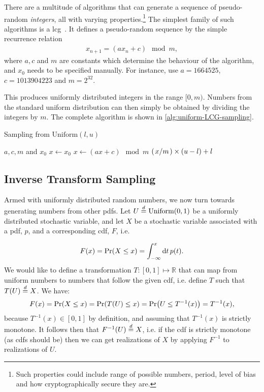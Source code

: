 \documentclass[Thesis.tex]{subfiles}
\begin{document}
There are a multitude of algorithms that can generate a sequence of
pseudo-random \emph{integers}, all with varying properties.\footnote{Such properties
could include range of possible numbers, period, level of bias and how
cryptographically secure they are.} The simplest family of
such algorithms is a \gls{lcg}~\cite{Knuth-1997-ACP-270146}. It defines a
pseudo-random sequence by the simple recurrence relation
\begin{align}
    \label{eq:linear-congruential-generator-relation}
    x_{n+1} = (ax_n + c)\mod m,
\end{align}
where $a, c$ and $m$ are constants which determine the behaviour of the
algorithm, and $x_0$ needs to be specified manually. For instance,
\textcite{Numerical-Recipes-Press-et-al} use $a = 1664525$, $c=1013904223$ and
$m=2^{32}$.

This produces uniformly distributed integers in the range $[0, m)$. Numbers
from the standard uniform distribution can then simply be obtained by dividing
the integers by $m$. The complete algorithm is shown in \cref{alg:uniform-LCG-sampling}.

\begin{algorithm}[h]
    \caption{Sampling from $\text{Uniform}(l, u)$}
    \label{alg:uniform-LCG-sampling}
    \begin{algorithmic}[1]
        \Require $a, c, m$ and $x_0$
            \State $x\gets x_0$
            \Repeat
                \State $x\gets (ax + c)\mod m$
                \State \Yield $(\flatfrac{x}{m}) \times (u - l) + l$
        \EndFunction
    \end{algorithmic}
\end{algorithm}

\subsection{Inverse Transform Sampling}

Armed with uniformly distributed random numbers, we now turn towards generating
numbers from other \glspl{pdf}. Let $U\overset{d}{=}\text{Uniform}(0,1)$ be a uniformly
distributed stochastic variable, and let $X$ be a stochastic variable
associated with a \gls{pdf}, $p$, and a corresponding \gls{cdf}, $F$, i.e.

\begin{align}
    F(x) = \text{Pr}\qty(X\leq x) = \int_{-\infty}^x \dd{t}p(t).
\end{align}
We would like to define a transformation $T:[0, 1]\mapsto\mathbb{R}$ that can map from uniform numbers to numbers that follow the given \gls{cdf}, i.e. define $T$ such that $T(U)\overset{d}{=} X$. We have:
\begin{align}
    F(x) = \text{Pr}\qty(X\leq x) = \text{Pr}\qty(T(U)\leq x) = \text{Pr}\qty(U \leq T^{-1}(x)) = T^{-1}(x),
\end{align}
because $T^{-1}(x)\in[0, 1]$ by definition, and assuming that $T^{-1}(x)$ is strictly monotone. It follows then that $F^{-1}(U)\overset{d}{=} X$, i.e. if the \gls{cdf} is strictly monotone (as \glspl{cdf} should be) then we can get realizations of $X$ by applying $F^{-1}$ to realizations of $U$.
\end{document}
